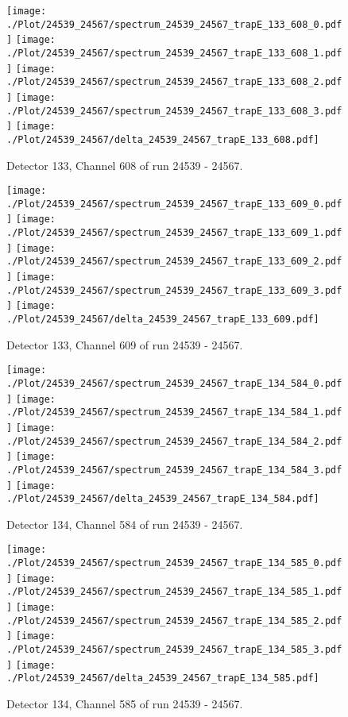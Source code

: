 \clearpage
\begin{figure}[hb]
\centering
\texttt{[image: ./Plot/24539\_24567/spectrum\_24539\_24567\_trapE\_133\_608\_0.pdf]}
\texttt{[image: ./Plot/24539\_24567/spectrum\_24539\_24567\_trapE\_133\_608\_1.pdf]}
\texttt{[image: ./Plot/24539\_24567/spectrum\_24539\_24567\_trapE\_133\_608\_2.pdf]}
\texttt{[image: ./Plot/24539\_24567/spectrum\_24539\_24567\_trapE\_133\_608\_3.pdf]}
\texttt{[image: ./Plot/24539\_24567/delta\_24539\_24567\_trapE\_133\_608.pdf]}
\caption{ Detector 133, Channel 608 of run 24539 - 24567.}
\label{fig:24539_24567_trapE_133_608}
\end{figure}
\clearpage
\begin{figure}[hb]
\centering
\texttt{[image: ./Plot/24539\_24567/spectrum\_24539\_24567\_trapE\_133\_609\_0.pdf]}
\texttt{[image: ./Plot/24539\_24567/spectrum\_24539\_24567\_trapE\_133\_609\_1.pdf]}
\texttt{[image: ./Plot/24539\_24567/spectrum\_24539\_24567\_trapE\_133\_609\_2.pdf]}
\texttt{[image: ./Plot/24539\_24567/spectrum\_24539\_24567\_trapE\_133\_609\_3.pdf]}
\texttt{[image: ./Plot/24539\_24567/delta\_24539\_24567\_trapE\_133\_609.pdf]}
\caption{ Detector 133, Channel 609 of run 24539 - 24567.}
\label{fig:24539_24567_trapE_133_609}
\end{figure}
\clearpage
\begin{figure}[hb]
\centering
\texttt{[image: ./Plot/24539\_24567/spectrum\_24539\_24567\_trapE\_134\_584\_0.pdf]}
\texttt{[image: ./Plot/24539\_24567/spectrum\_24539\_24567\_trapE\_134\_584\_1.pdf]}
\texttt{[image: ./Plot/24539\_24567/spectrum\_24539\_24567\_trapE\_134\_584\_2.pdf]}
\texttt{[image: ./Plot/24539\_24567/spectrum\_24539\_24567\_trapE\_134\_584\_3.pdf]}
\texttt{[image: ./Plot/24539\_24567/delta\_24539\_24567\_trapE\_134\_584.pdf]}
\caption{ Detector 134, Channel 584 of run 24539 - 24567.}
\label{fig:24539_24567_trapE_134_584}
\end{figure}
\clearpage
\begin{figure}[hb]
\centering
\texttt{[image: ./Plot/24539\_24567/spectrum\_24539\_24567\_trapE\_134\_585\_0.pdf]}
\texttt{[image: ./Plot/24539\_24567/spectrum\_24539\_24567\_trapE\_134\_585\_1.pdf]}
\texttt{[image: ./Plot/24539\_24567/spectrum\_24539\_24567\_trapE\_134\_585\_2.pdf]}
\texttt{[image: ./Plot/24539\_24567/spectrum\_24539\_24567\_trapE\_134\_585\_3.pdf]}
\texttt{[image: ./Plot/24539\_24567/delta\_24539\_24567\_trapE\_134\_585.pdf]}
\caption{ Detector 134, Channel 585 of run 24539 - 24567.}
\label{fig:24539_24567_trapE_134_585}
\end{figure}
